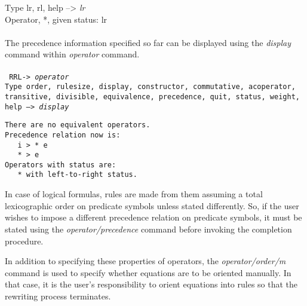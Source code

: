 Type lr, rl, help --> {\em lr}\\
Operator, *, given status: lr \\ \\
\rm
The precedence information specified so far can be
displayed using the {\em display} command within
{\em operator} command.\\ \\
\tt
RRL-> {\em operator}\\
Type order, rulesize, display, constructor, commutative, acoperator, \\
\hspace*{0.4in}
     transitive, divisible, equivalence, precedence, quit, status, weight, \\
\hspace*{0.4in}
     help --> {\em display}
\begin{verbatim}
There are no equivalent operators.
Precedence relation now is: 
   i > * e 
   * > e 
Operators with status are:
   * with left-to-right status.
\end{verbatim}
\rm
In case of logical formulas, rules are made from them assuming a total
lexicographic order on predicate symbols unless stated differently. So,
if the user wishes to impose a different precedence relation on
predicate symbols, it must be stated using the {\em
operator/precedence} command before invoking the completion procedure.

In addition to specifying these properties of operators, the {\em
operator/order/m} command is used to specify whether equations are to be
oriented manually.  In that case, it is the user's responsibility to
orient equations into rules so that the rewriting process terminates.

